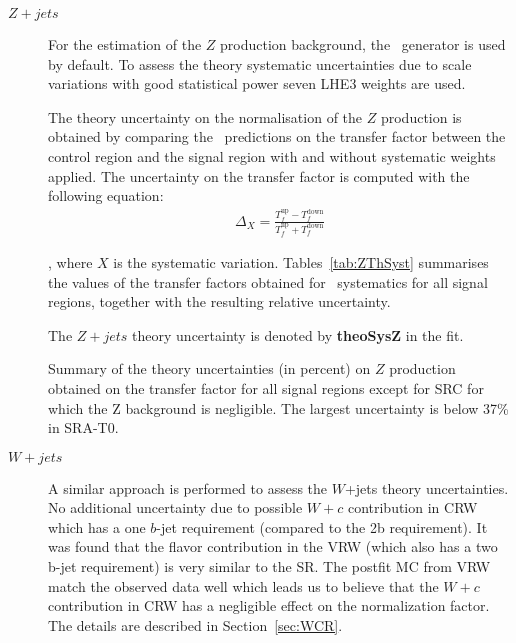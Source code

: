 \begin{description}
\item[\boldmath $Z+jets$] For the estimation of the $Z$ production background, the \sherpa\ generator is used by default. To assess the theory systematic uncertainties due to scale variations with good statistical power seven LHE3 weights are used. 

The theory uncertainty on the normalisation of the $Z$ production is obtained by comparing the \sherpa\ predictions on the transfer factor between the control region and the signal region with and without systematic weights applied. The uncertainty on the transfer factor is computed with the following equation: 
      \begin{eqnarray}
    \Delta_{X} = \frac{T_f^{\mathrm{up}} - T_f^{\mathrm{down}}}{T_f^{\mathrm{up}} + T_f^{\mathrm{down}}}
    \label{eq:theory_uncertainty}
  \end{eqnarray}

  , where $X$ is the systematic variation. Tables~\ref{tab:ZThSyst} summarises the values of the transfer factors obtained for \sherpa\ systematics for all signal regions, together with the resulting relative uncertainty.

  The $Z+jets$ theory uncertainty is denoted by {\bf theoSysZ} in the fit.

  \begin{table}[!h]
    \begin{center} \footnotesize

    \end{center}
    \caption{Summary of the theory uncertainties (in percent) on $Z$ production obtained on the transfer factor for all signal regions except for SRC for which the Z background is negligible. The largest uncertainty is below 37\% in SRA-T0. }
    \label{tab:ZThSyst}
  \end{table}  
  

\item[\boldmath $W+jets$]
  A similar approach is performed to assess the $W$+jets theory uncertainties. No additional uncertainty due to possible $W+c$ contribution in CRW which has a one $b$-jet requirement (compared to the 2b requirement). It was found that the flavor contribution in the VRW (which also has a two b-jet requirement) is very similar to the SR. The postfit MC from VRW match the observed data well which leads us to believe that the $W+c$ contribution in CRW has a negligible effect on the normalization factor. The details are described in Section~\ref{sec:WCR}. 


\end{description}

